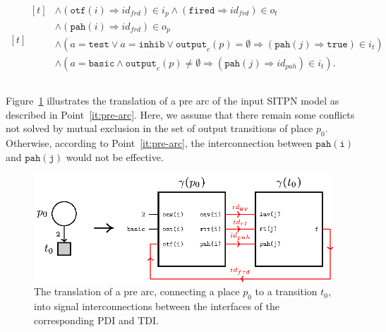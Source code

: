 \begin{definition}
\begin{enumerate}[resume]
\begin{equation*}
\begin{aligned}[t]
\begin{aligned}[t]
                                      & \land(\mathtt{otf}(i)\Rightarrow{}id_{frd})\in{}i_p\land(\mathtt{fired}\Rightarrow{}id_{frd})\in{}o_t \\
                                      & \land(\mathtt{pah}(i)\Rightarrow{}id_{frd})\in{}o_p \\
                                      & \land(a=\mathtt{test}\lor{}a=\mathtt{inhib}\lor{}\mathtt{output}_c(p)=\emptyset\Rightarrow(\mathtt{pah}(j)\Rightarrow\mathtt{true})\in{}i_t) \\
                                      & \land(a=\mathtt{basic}\land{}\mathtt{output}_c(p)\neq\emptyset\Rightarrow(\mathtt{pah}(j)\Rightarrow{}id_{pah})\in{}i_t). \\
                    \end{aligned} \\
      \end{aligned}
    \end{equation*}
  \end{enumerate}

  \bigskip
  
  Figure~\ref{fig:gen-pre-arc} illustrates the translation of a pre
  arc of the input SITPN model as described in Point~\ref{it:pre-arc}.
  Here, we assume that there remain some conflicts not solved by
  mutual exclusion in the set of output transitions of place
  $p_0$. Otherwise, according to Point~\ref{it:pre-arc}, the
  interconnection between $\mathtt{pah(i)}$ and $\mathtt{pah(j)}$
  would not be effective.
  
  \begin{figure}[h]
    \centering
    \includegraphics[keepaspectratio,width=.8\textwidth]{gen-pre-arc.eps}
    \caption{The translation of a pre arc, connecting a place $p_0$ to
      a transition $t_0$, into signal interconnections between the
      interfaces of the corresponding PDI and TDI. }
    \label{fig:gen-pre-arc}
  \end{figure}


\end{definition}
